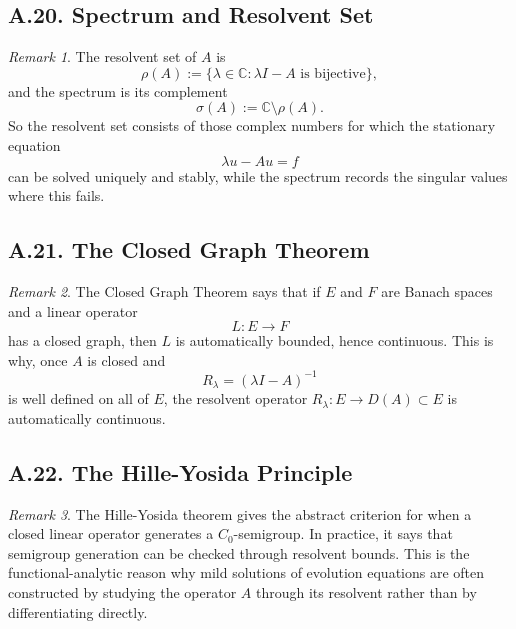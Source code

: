 \documentclass[11pt]{article}
\theoremstyle{definition}
\theoremstyle{remark}
\newtheorem{remark}{Remark}
\begin{document}
\subsection*{A.20. Spectrum and Resolvent Set}
\begin{remark}
The resolvent set of \(A\) is
\[
\rho(A):=\{\lambda\in\mathbb C:\lambda I-A \text{ is bijective}\},
\]
and the spectrum is its complement
\[
\sigma(A):=\mathbb C\setminus \rho(A).
\]
So the resolvent set consists of those complex numbers for which the stationary equation
\[
\lambda u-Au=f
\]
can be solved uniquely and stably, while the spectrum records the singular values where this fails.
\end{remark}

\subsection*{A.21. The Closed Graph Theorem}
\begin{remark}
The Closed Graph Theorem says that if \(E\) and \(F\) are Banach spaces and a linear operator
\[
L:E\to F
\]
has a closed graph, then \(L\) is automatically bounded, hence continuous. This is why, once \(A\) is closed and
\[
R_\lambda=(\lambda I-A)^{-1}
\]
is well defined on all of \(E\), the resolvent operator \(R_\lambda:E\to D(A)\subset E\) is automatically continuous.
\end{remark}

\subsection*{A.22. The Hille-Yosida Principle}
\begin{remark}
The Hille-Yosida theorem gives the abstract criterion for when a closed linear operator generates a \(C_0\)-semigroup. In practice, it says that semigroup generation can be checked through resolvent bounds. This is the functional-analytic reason why mild solutions of evolution equations are often constructed by studying the operator \(A\) through its resolvent rather than by differentiating directly.
\end{remark}
\end{document}
